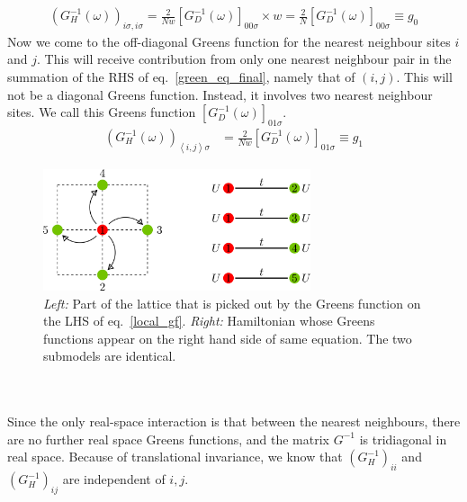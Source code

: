 \documentclass[12pt]{article}
\numberwithin{equation}{section}
\begin{document}
\begin{equation}\begin{aligned}
	\label{local_gf}
	\left(G_{H}^{-1}(\omega)\right)_{i\sigma,i\sigma} = \frac{2}{Nw}\left[G_{D}^{-1}(\omega)\right]_{00\sigma}\times w = \frac{2}{N}\left[G_{D}^{-1}(\omega)\right]_{00\sigma} \equiv g_0
\end{aligned}\end{equation}
Now we come to the off-diagonal Greens function for the nearest neighbour sites $i$ and $j$. This will receive contribution from only one nearest neighbour pair in the summation of the RHS of eq.~\ref{green_eq_final}, namely that of $\left(i,j\right)$. This will not be a diagonal Greens function. Instead, it involves two nearest neighbour sites. We call this Greens function $\left[G_D^{-1}(\omega)\right]_{01\sigma}$.
\begin{equation}\begin{aligned}
	\left(G_{H}^{-1}(\omega)\right)_{\left<i,j \right>\sigma} &= \frac{2}{Nw}\left[G_{D}^{-1}(\omega)\right]_{01\sigma} \equiv g_1
\end{aligned}\end{equation}
\begin{figure}[htpb!]
	\centering
	\hspace*{\fill}
	\includegraphics[width=0.7\textwidth]{./lattice.png}
	\hspace*{\fill}
	\caption{\textit{Left:} Part of the lattice that is picked out by the Greens function on the LHS of eq.~\ref{local_gf}. \textit{Right:} Hamiltonian whose Greens functions appear on the right hand side of same equation. The two submodels are identical.}
	\label{fig:}
\end{figure}
\\\\
Since the only real-space interaction is that between the nearest neighbours, there are no further real space Greens functions, and the matrix $G^{-1}$ is tridiagonal in real space. Because of translational invariance, we know that $\left(G_H^{-1}\right)_{ii}$ and $\left(G_H^{-1}\right)_{ij}$ are independent of $i,j$. 
\end{document}
